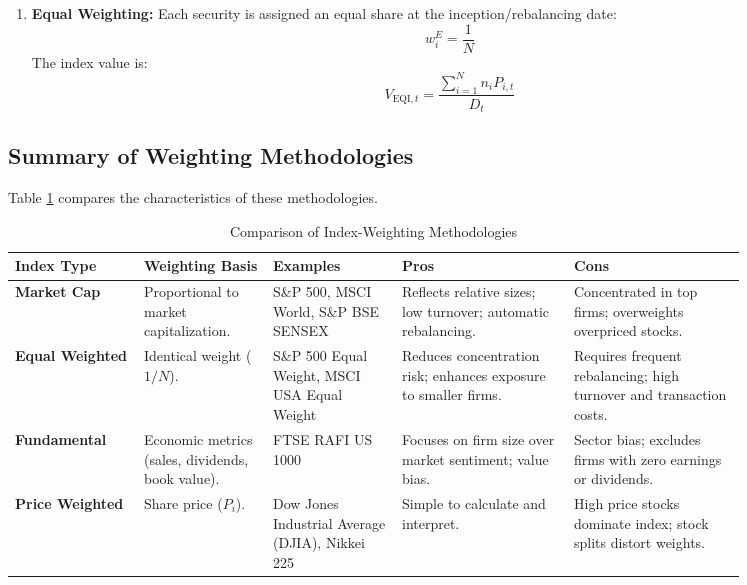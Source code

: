 \begin{enumerate}
	\item \textbf{Equal Weighting:} Each security is assigned an equal share at the inception/rebalancing date:
	      \begin{equation}
		      w_i^E = \frac{1}{N}
		      \label{eq:equal_weight}
	      \end{equation}
	      The index value is:
	      \begin{equation}
		      V_{\text{EQI},t} = \frac{\sum_{i=1}^{N} n_i P_{i,t}}{D_t}
		      \label{eq:equal_weighted_value}
	      \end{equation}
\end{enumerate}

\subsection{Summary of Weighting Methodologies}
	\label{subsec:Summary of Weighting Methodologies}
Table \ref{tab:index_weighting_methodologies_summary} compares the characteristics of these methodologies.

\begin{table}[!htbp]
\centering
\caption{Comparison of Index-Weighting Methodologies}
\label{tab:index_weighting_methodologies_summary}
\begin{tabular}{p{0.15\linewidth} p{0.15\linewidth} p{0.15\linewidth} p{0.2\linewidth} p{0.2\linewidth}}
\toprule
\textbf{Index Type} & \textbf{Weighting Basis} & \textbf{Examples} & \textbf{Pros} & \textbf{Cons} \\
\midrule
\textbf{Market Cap} & Proportional to market capitalization. & S\&P 500, MSCI World, S\&P BSE SENSEX & Reflects relative sizes; low turnover; automatic rebalancing. & Concentrated in top firms; overweights overpriced stocks. \\
\midrule
\textbf{Equal Weighted} & Identical weight ($1/N$). & S\&P 500 Equal Weight, MSCI USA Equal Weight & Reduces concentration risk; enhances exposure to smaller firms. & Requires frequent rebalancing; high turnover and transaction costs. \\
\midrule
\textbf{Fundamental} & Economic metrics (sales, dividends, book value). & FTSE RAFI US 1000 & Focuses on firm size over market sentiment; value bias. & Sector bias; excludes firms with zero earnings or dividends. \\
\midrule
\textbf{Price Weighted} & Share price ($P_i$). & Dow Jones Industrial Average (DJIA), Nikkei 225 & Simple to calculate and interpret. & High price stocks dominate index; stock splits distort weights. \\
\bottomrule
\end{tabular}
\end{table}

